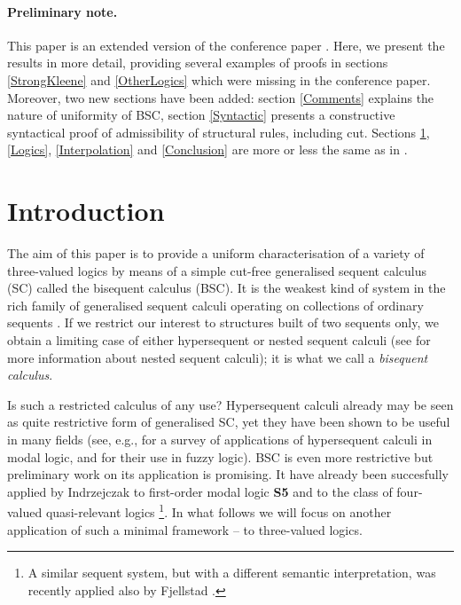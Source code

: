 \documentclass[11pt,a4paper,titlepage]{article}
\theoremstyle{definition}
\newcommand{\3}{\vspace{.3in}}
\newcommand{\2}{\vspace{.2in}}
\newcommand{\1}{\vspace{.1in}}
\newcommand{\5}{\vspace{.05in}}
\begin{document}
\paragraph{Preliminary note.} This paper is an extended version of the conference paper \cite{IndrzejczakPetrukhinCADE}. Here, we present the results in more detail, providing several examples of proofs in sections \ref{StrongKleene} and \ref{OtherLogics} which were missing in the conference paper. Moreover, two new sections have been added: section \ref{Comments} explains the nature of uniformity of BSC, section \ref{Syntactic} presents a constructive syntactical proof of admissibility of structural rules, including cut. Sections \ref{Intro}, \ref{Logics}, \ref{Interpolation} and \ref{Conclusion} are more or less the same as in \cite{IndrzejczakPetrukhinCADE}.

\section{Introduction}\label{Intro}
The aim of this paper is to provide a uniform characterisation of a variety of three-valued logics by means of a  simple cut-free generalised sequent calculus (SC) called the bisequent calculus (BSC).  It is the weakest kind of system in the rich family of generalised sequent calculi operating
on collections of ordinary sequents \cite{Indrzejczak1}. If we restrict our interest to structures built of two sequents only, we obtain a limiting case of either hypersequent or nested sequent calculi (see \cite{LellmannPoggiolesi,Poggiolesi} for more information about nested sequent calculi); it is what we call a \textit{bisequent calculus}. 

 Is such a restricted calculus of any use? Hypersequent calculi already may be seen as quite restrictive form of generalised SC, yet they have been shown to be useful in many fields (see, e.g., \cite{Indrzejczak2} for a survey of applications of hypersequent calculi in modal logic, and \cite{MetcalfeOlivettiGabbay} for their use in fuzzy logic). BSC is even more restrictive but preliminary work on its application is promising.
It have already been succesfully applied by Indrzejczak to first-order modal logic {\bf S5} \cite{Indrzejczak1} and to the class of four-valued quasi-relevant logics \cite{Indrzejczak3}\footnote{A similar sequent system, but with a different semantic interpretation, was recently applied also by Fjellstad \cite{Fjellstad1,Fjellstad2}.}. In what follows we will focus on another application of such a minimal framework -- to three-valued logics.
\end{document}
